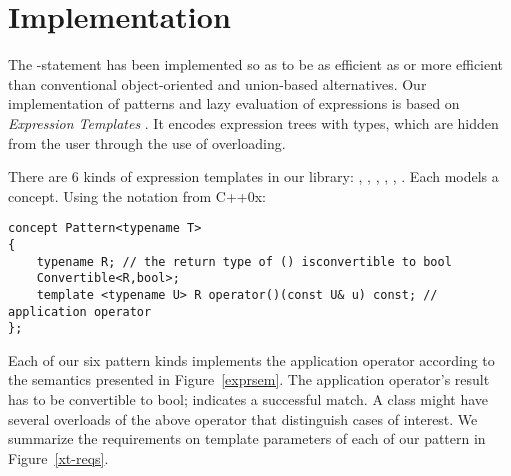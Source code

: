 \section{Implementation} %
\label{sec:impl}

The -statement has been implemented so as to be as efficient as or 
more efficient than conventional object-oriented and union-based 
alternatives\cite{TypeSwitch}. Our implementation of patterns and lazy 
evaluation of expressions is based on \emph{Expression Templates} 
\cite{Veldhuizen95expressiontemplates,vandevoorde2003c++}. It encodes 
expression trees with types, which are hidden from the user through the use of 
overloading.

There are 6 kinds of expression templates in our library: , 
, , , , 
. Each models a  concept.
Using the notation from C++0x\cite{C++0xConcepts}:

\begin{lstlisting}[keepspaces,columns=flexible]
concept Pattern<typename T> 
{
    typename R; // the return type of () isconvertible to bool
    Convertible<R,bool>;
    template <typename U> R operator()(const U& u) const; // application operator
};
\end{lstlisting}

Each of our six pattern kinds 
implements the application operator according to the semantics presented in 
Figure~\ref{exprsem}. The application operator's result has to be 
convertible to bool;
 indicates a successful match. A class might have several overloads of 
the above operator that distinguish cases of interest. We summarize the requirements on template parameters of each of our 
pattern in Figure~\ref{xt-reqs}.

